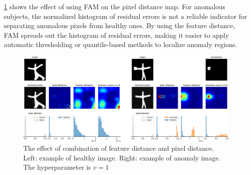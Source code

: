 \cref{fig:hist-ano-map} shows the effect of using \ac{FAM} on the pixel distance map. For anomalous subjects, the normalized histogram of residual errors is not a reliable indicator for separating anomalous pixels from healthy ones. By using the feature distance, \ac{FAM} spreads out the histogram of residual errors, making it easier to apply automatic thresholding or quantile-based methods to localize anomaly regions.

\begin{figure}[h]
    \centering
    \includegraphics[width=1\linewidth]{figures/hist-ano-map.pdf}
    \caption[Effect of FAM on anomaly score map]{The effect of combination of feature distance and pixel distance. Left: example of healthy image. Right: example of anomaly image. The hyperparameter is $v=1$}
    \label{fig:hist-ano-map}
\end{figure}

